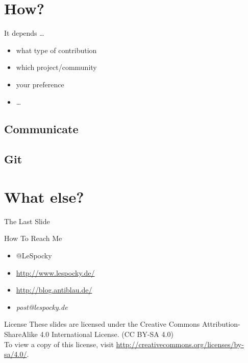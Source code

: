 \documentclass{beamer}
\begin{document}
\section{How?}

\begin{frame}{It depends \dots}
    \begin{itemize}
        \item what type of contribution
        \item which project/community
        \item your preference
        \item \dots
    \end{itemize}
\end{frame}

\subsection{Communicate}

\subsection{Git}

\section*{What else?}

\begin{frame}{The Last Slide}
    \begin{block}{How To Reach Me}
        \begin{itemize}
            \item @LeSpocky
            \item \url{http://www.lespocky.de/}
            \item \url{http://blog.antiblau.de/}
            \item \emph{post@lespocky.de}
        \end{itemize}
    \end{block}
    \begin{block}{License}
        These slides are licensed under the Creative Commons
        Attribution-ShareAlike 4.0 International License. (CC BY-SA 4.0) \\
        To view a copy of this license, visit
        \url{http://creativecommons.org/licenses/by-sa/4.0/}.
    \end{block}
\end{frame}
\end{document}
